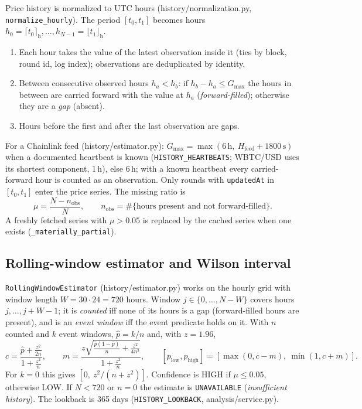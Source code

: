 \documentclass[11pt,a4paper]{article}
\newcommand{\code}[1]{\texttt{#1}}
\newcommand{\src}[1]{\textsf{\small #1}}
\begin{document}
Price history is normalized to UTC hours (\src{history/normalization.py},
\code{normalize\_hourly}). The period $[t_0,t_1]$ becomes hours
$h_0=\lceil t_0\rceil_{\text{h}},\dots,h_{N-1}=\lfloor t_1\rfloor_{\text{h}}$.
\begin{enumerate}
\item Each hour takes the value of the latest observation inside it (ties by
  block, round id, log index); observations are deduplicated by identity.
\item Between consecutive observed hours $h_a<h_b$: if $h_b-h_a\leq G_{\max}$
  the hours in between are carried forward with the value at $h_a$
  (\emph{forward-filled}); otherwise they are a \emph{gap} (absent).
\item Hours before the first and after the last observation are gaps.
\end{enumerate}
For a Chainlink feed (\src{history/estimator.py}):
$G_{\max}=\max(6\,\text{h},\ H_{\text{feed}}+1800\,\text{s})$ when a documented
heartbeat is known (\code{HISTORY\_HEARTBEATS}; WBTC/USD uses its shortest
component, 1\,h), else 6\,h; with a known heartbeat every carried-forward hour is
counted as an observation. Only rounds with \code{updatedAt} in $[t_0,t_1]$ enter
the price series. The missing ratio is
\begin{equation}
\mu=\frac{N-n_{\text{obs}}}{N},\qquad n_{\text{obs}}=\#\{\text{hours present and not forward-filled}\}.
\end{equation}
A freshly fetched series with $\mu>0.05$ is replaced by the cached series when one
exists (\code{\_materially\_partial}).

\subsection{Rolling-window estimator and Wilson interval}\label{sec:wilson}

\code{RollingWindowEstimator} (\src{history/estimator.py}) works on the hourly
grid with window length $W=30\cdot24=720$ hours. Window $j\in\{0,\dots,N-W\}$
covers hours $j,\dots,j+W-1$; it is \emph{counted} iff none of its hours is a gap
(forward-filled hours are present), and is an \emph{event window} iff the event
predicate holds on it. With $n$ counted and $k$ event windows,
$\hat p=k/n$ and, with $z=1.96$,
\begin{equation}
c=\frac{\hat p+\frac{z^2}{2n}}{1+\frac{z^2}{n}},\qquad
m=\frac{z\sqrt{\frac{\hat p(1-\hat p)}{n}+\frac{z^2}{4n^2}}}{1+\frac{z^2}{n}},\qquad
[p_{\text{low}},p_{\text{high}}]=[\max(0,c-m),\ \min(1,c+m)].
\end{equation}
For $k=0$ this gives $[0,\ z^2/(n+z^2)]$. Confidence is HIGH if $\mu\leq0.05$,
otherwise LOW. If $N<720$ or $n=0$ the estimate is \code{UNAVAILABLE}
(\emph{insufficient history}). The lookback is 365 days
(\code{HISTORY\_LOOKBACK}, \src{analysis/service.py}).
\end{document}
